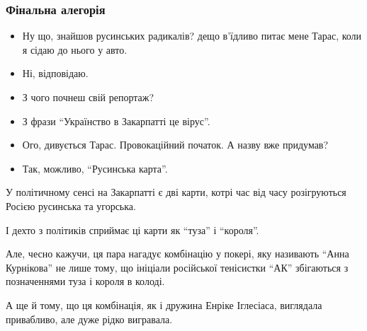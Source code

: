  
 
 

\subsubsection{Фінальна алегорія}
\label{sec:11_11_2020.news.ua.pravda.1.rusynstvo.final_allegory}

\begin{itemize}
  \item \dshM Ну що, знайшов русинських радикалів? \dshM дещо в’їдливо питає мене Тарас, коли я сідаю до нього у авто.
  \item \dshM Ні, \dshM відповідаю.
  \item \dshM З чого почнеш свій репортаж?
  \item \dshM З фрази \enquote{Українство в Закарпатті \dshM це вірус}.
  \item \dshM Ого, \dshM дивується Тарас. \dshM Провокаційний початок. А назву вже придумав?
  \item \dshM Так, можливо, \enquote{Русинська карта}.
\end{itemize}

У політичному сенсі на Закарпатті є дві карти, котрі час від часу розігруються
Росією \dshM русинська та угорська.

І дехто з політиків сприймає ці карти як \enquote{туза} і \enquote{короля}.

Але, чесно кажучи, ця пара нагадує комбінацію у покері, яку називають \enquote{Анна
Курнікова} \dshM не лише тому, що ініціали російської тенісистки \enquote{АК} збігаються з
позначеннями туза і короля в колоді.

А ще й тому, що ця комбінація, як і дружина Енріке Іглесіаса, виглядала
привабливо, але дуже рідко вигравала.
